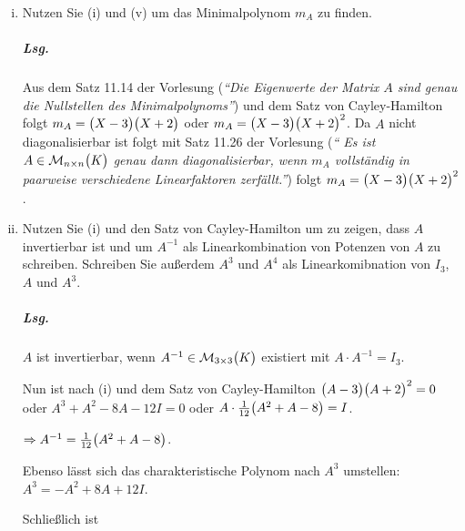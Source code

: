 \documentclass{scrreprt}
\begin{document}
\begin{enumerate}[(i)]
\item Nutzen Sie (i) und (v) um das Minimalpolynom $m_A$ zu finden.
  \subparagraph{Lsg.} Aus dem Satz 11.14 der Vorlesung (\emph{``Die Eigenwerte
    der Matrix $A$ sind genau die Nullstellen des Minimalpolynoms''}) und dem
  Satz von Cayley-Hamilton folgt $m_A = \qty\big(X - 3)\qty\big(X + 2)$ oder
  $m_A = \qty\big(X - 3)\qty\big(X + 2)^2$.
  Da $A$ nicht diagonalisierbar ist folgt mit Satz 11.26 der Vorlesung (\emph{``
    Es ist $A \in \mathcal{M}_{n \times n}\qty\big(K)$ genau dann
    diagonalisierbar, wenn $m_A$ vollständig in paarweise verschiedene
    Linearfaktoren zerfällt.''}) folgt $m_A = \qty\big(X - 3)\qty\big(X + 2)^2$.

\item Nutzen Sie (i) und den Satz von Cayley-Hamilton um zu zeigen, dass $A$
  invertierbar ist und um $A^{-1}$ als Linearkombination von Potenzen von $A$ zu
  schreiben.
  Schreiben Sie außerdem $A^3$ und $A^4$ als Linearkomibnation von $I_3$, $A$ und
  $A^3$.
  \subparagraph{Lsg.} $A$ ist invertierbar, wenn
  $A^{-1} \in \mathcal{M}_{3 \times 3}\qty\big(K)$ existiert mit
  $A \cdot A^{-1} = I_3$.

  Nun ist nach (i) und dem Satz von Cayley-Hamilton
  $\qty\big(A - 3)\qty\big(A + 2)^2 = 0$ oder $A^3 + A^2 - 8A - 12I = 0$
  oder $A \cdot \frac{1}{12}\qty\big(A^2 + A - 8) = I$.

  $\Rightarrow A^{-1} = \frac{1}{12}\qty\big(A^2 + A - 8)$.

  Ebenso lässt sich das charakteristische Polynom nach $A^3$ umstellen:
  $A^3 = -A^2 + 8A + 12I$.

  Schließlich ist
\end{enumerate}

\newpage
\end{document}
